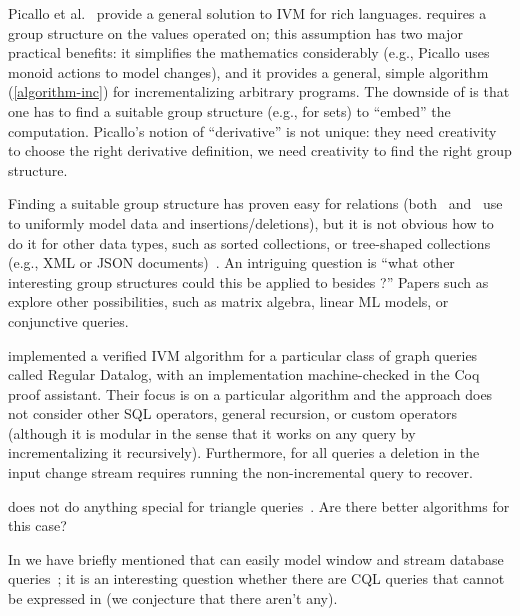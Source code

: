Picallo et al.~\cite{picallo-scop19} provide a general solution to IVM for
rich languages.  \dbsp requires a group structure on the values operated on; 
this assumption has two major practical benefits: it simplifies the mathematics considerably
(e.g., Picallo uses monoid actions to model changes), and it provides a general, simple
algorithm (\ref{algorithm-inc}) for incrementalizing arbitrary programs.  The downside of 
\dbsp is that one has to find a suitable group structure (e.g., \zrs for sets) to ``embed'' 
the computation.  Picallo's notion of ``derivative'' is not unique: they need creativity to choose
the right derivative definition, we need creativity to find the right group structure.

Finding a suitable group structure has proven easy for relations (both~\cite{koch-pods10}
and~\cite{green-tcs11} use \zrs to uniformly model data and insertions/deletions), but it is 
not obvious how to do it for other data types, such as sorted collections, or tree-shaped
collections (e.g., XML or JSON documents)~\cite{foster-planx08}.  An intriguing question
is ``what other interesting group structures could this be applied to besides \zrs?''
Papers such as~\cite{nikolic-icmd18} explore other possibilities, such as matrix algebra,
linear ML models, or conjunctive queries.

\citet{bonifati-iclp2018} implemented a verified IVM algorithm for a particular
class of graph queries called Regular Datalog, with an implementation machine-checked in the
Coq proof assistant. Their focus is on a particular algorithm and the approach does not
consider other SQL operators, general recursion, or custom operators (although it is modular
in the sense that it works on any query by incrementalizing it recursively). Furthermore,
for all queries a deletion in the input change stream requires running the non-incremental
query to recover.

\dbsp does not do anything special for triangle queries~\cite{kara-tds20}.  Are there
better algorithms for this case?   

In  we have briefly mentioned that \dbsp can easily
model window and stream database queries~\cite{arasu-tr02,aurora}; it is an
interesting question whether there are CQL queries that cannot be expressed in \dbsp
(we conjecture that there aren't any).

\begin{comment}
The main problem that change structures address is that the types used in programs are not
closed under subtraction (e.g., the delta between two sets is not a set). 
Although a relational \dbsp circuit computes
only on positive \zr values, its incremental version may compute on negative 
values, but the equivalence of the two programs guarantees correctness even though the
type system of \zrs does not.  \val{Safe to delete this para}
\end{comment}


